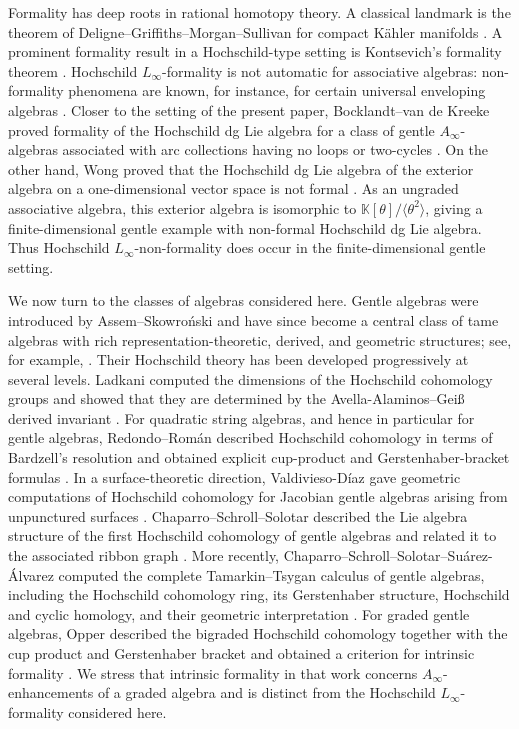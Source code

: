 \documentclass[11pt,a4paper,reqno]{amsart}
\newcommand{\mK}{\mathbb K}
\theoremstyle{plain}
\theoremstyle{definition}
\numberwithin{equation}{section}
\begin{document}
	Formality has deep roots in rational homotopy theory.  A classical landmark
	is the theorem of Deligne--Griffiths--Morgan--Sullivan for compact K\"ahler
	manifolds \cite{DGMS75}.  A prominent formality result in a Hochschild-type
	setting is Kontsevich's formality theorem \cite{Kon03}.  Hochschild
	$L_\infty$-formality is not automatic for associative algebras: non-formality
	phenomena are known, for instance, for certain universal enveloping algebras
	\cite{BEGM23}.  Closer to the setting of the present paper,
	Bocklandt--van de Kreeke proved formality of the Hochschild dg Lie algebra for
	a class of gentle $A_\infty$-algebras associated with arc collections having
	no loops or two-cycles \cite{BK24}.
	On the other hand, Wong proved that the Hochschild dg Lie algebra
	of the exterior algebra on a one-dimensional vector space is not
	formal \cite[Theorem~6.3]{Won17}. As an ungraded associative algebra,
	this exterior algebra is isomorphic to
	$\mK[\theta]/\langle\theta^2\rangle$, giving a finite-dimensional
	gentle example with non-formal Hochschild dg Lie algebra.  Thus Hochschild
	$L_\infty$-non-formality does occur in the finite-dimensional gentle setting.
	
	We now turn to the classes of algebras considered here.  Gentle algebras were
	introduced by Assem--Skowro\'nski \cite{AS87} and have since become a central
	class of tame algebras with rich representation-theoretic, derived, and
	geometric structures; see, for example, \cite{AG08}.  Their Hochschild theory
	has been developed progressively at several levels.  Ladkani computed the
	dimensions of the Hochschild cohomology groups and showed that they are
	determined by the Avella-Alaminos--Gei\ss{} derived invariant \cite{Lad12}.
	For quadratic string algebras, and hence in particular for gentle algebras,
	Redondo--Rom\'an described Hochschild cohomology in terms of Bardzell's
	resolution and obtained explicit cup-product and Gerstenhaber-bracket formulas
	\cite{RR18b}.  In a surface-theoretic direction, Valdivieso-D\'iaz gave
	geometric computations of Hochschild cohomology for Jacobian gentle algebras
	arising from unpunctured surfaces \cite{VD15}.  Chaparro--Schroll--Solotar
	described the Lie algebra structure of the first Hochschild cohomology of
	gentle algebras and related it to the associated ribbon graph \cite{CSS20}.
	More recently, Chaparro--Schroll--Solotar--Su\'arez-\'Alvarez computed the
	complete Tamarkin--Tsygan calculus of gentle algebras, including the
	Hochschild cohomology ring, its Gerstenhaber structure, Hochschild and cyclic
	homology, and their geometric interpretation \cite{CSSSA26}.  For graded
	gentle algebras, Opper described the bigraded Hochschild cohomology together
	with the cup product and Gerstenhaber bracket and obtained a criterion for
	intrinsic formality \cite{Opp26}.  We stress that intrinsic formality in that
	work concerns $A_\infty$-enhancements of a graded algebra and is distinct from
	the Hochschild $L_\infty$-formality considered here.
	
\end{document}

